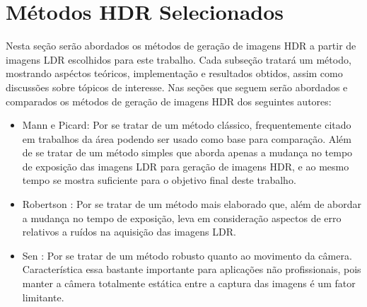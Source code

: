 \section{Métodos HDR Selecionados} \label{metodos}
Nesta seção serão abordados os métodos de geração de imagens HDR a partir de imagens LDR escolhidos para este trabalho. Cada subseção tratará um método, mostrando aspéctos teóricos, implementação e resultados obtidos, assim como discussões sobre tópicos de interesse. Nas seções que seguem serão abordados e comparados os métodos de geração de imagens HDR dos seguintes autores:

\begin{itemize}
\item Mann e Picard: Por se tratar de um método clássico, frequentemente citado em trabalhos da área podendo ser usado como base para comparação. Além de se tratar de um método simples que aborda apenas a mudança no tempo de exposição das imagens LDR para geração de imagens HDR, e ao mesmo tempo se mostra suficiente para o objetivo final deste trabalho.
\item Robertson \etal: Por se tratar de um método mais elaborado que, além de abordar a mudança no tempo de exposição, leva em consideração aspectos de erro relativos a ruídos na aquisição das imagens LDR. 
\item Sen \etal: Por se tratar de um método robusto quanto ao movimento da câmera. Característica essa bastante importante para aplicações não profissionais, pois manter a câmera totalmente estática entre a captura das imagens é um fator limitante.
\end{itemize}

